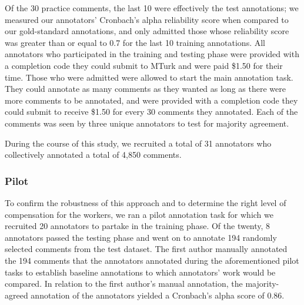 Of the 30 practice comments, the last 10 were effectively the test annotations; we measured our annotators’ Cronbach's alpha reliability score when compared to our gold-standard annotations, and only admitted those whose reliability score was greater than or equal to 0.7 for the last 10 training annotations. All annotators who participated in the training and testing phase were provided with a completion code they could submit to MTurk and were paid \$1.50 for their time. Those who were admitted were allowed to start the main annotation task. They could annotate as many comments as they wanted as long as there were more comments to be annotated, and were provided with a completion code they could submit to receive \$1.50 for every 30 comments they annotated. Each of the comments was seen by three unique annotators to test for majority agreement. 

During the course of this study, we recruited a total of 31 annotators who collectively annotated a total of 4,850 comments. 


\subsubsection{Pilot} 
To confirm the robustness of this approach and  to determine the right level of compensation for the workers, we ran a pilot annotation task for which we recruited 20 annotators to partake in the training phase. Of the twenty, 8 annotators passed the testing phase and went on to annotate 194 randomly selected comments from the test dataset. The first author manually annotated the 194 comments that the annotators annotated during the aforementioned pilot tasks to establish baseline annotations to which annotators' work would be compared. In relation to the first author’s manual annotation, the majority-agreed annotation of the annotators yielded a Cronbach's alpha score of 0.86. 
